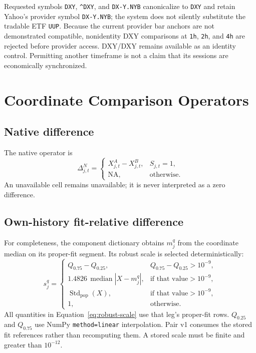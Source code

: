 \documentclass{article}
\newcommand{\NA}{\mathrm{NA}}
\newcommand{\med}{\operatorname{median}}
\begin{document}
Requested symbols \texttt{DXY}, \texttt{\^{}DXY}, and \texttt{DX-Y.NYB} canonicalize to \texttt{DXY} and retain Yahoo's provider symbol \texttt{DX-Y.NYB}; the system does not silently substitute the tradable ETF \texttt{UUP}. Because the current provider bar anchors are not demonstrated compatible, nonidentity DXY comparisons at \texttt{1h}, \texttt{2h}, and \texttt{4h} are rejected before provider access. DXY/DXY remains available as an identity control. Permitting another timeframe is not a claim that its sessions are economically synchronized.

\section{Coordinate Comparison Operators}

\subsection{Native difference}

The native operator is
\begin{equation}
\Delta^{N}_{j,t}=
\begin{cases}
X^A_{j,t}-X^B_{j,t}, & S_{j,t}=1,\\
\NA, & \text{otherwise}.
\end{cases}
\label{eq:native}
\end{equation}
An unavailable cell remains unavailable; it is never interpreted as a zero difference.

\subsection{Own-history fit-relative difference}

For completeness, the component dictionary obtains $m^q_j$ from the coordinate median on its proper-fit segment. Its robust scale is selected deterministically:
\begin{equation}
s^q_j=
\begin{cases}
Q_{0.75}-Q_{0.25}, & Q_{0.75}-Q_{0.25}>10^{-9},\\
1.4826\,\med|X-m^q_j|, & \text{if that value}>10^{-9},\\
\operatorname{Std}_{\mathrm{pop}}(X), & \text{if that value}>10^{-9},\\
1, & \text{otherwise}.
\end{cases}
\label{eq:robust-scale}
\end{equation}
All quantities in Equation~\ref{eq:robust-scale} use that leg's proper-fit rows. $Q_{0.25}$ and $Q_{0.75}$ use NumPy \texttt{method=linear} interpolation. Pair v1 consumes the stored fit references rather than recomputing them. A stored scale must be finite and greater than $10^{-12}$.
\end{document}
